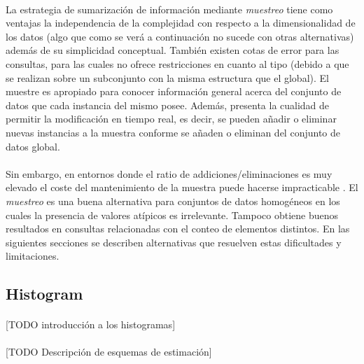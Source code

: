 \documentclass{subfiles}
\begin{document}
        \paragraph{}
        La estrategia de sumarización de información mediante \emph{muestreo} tiene como ventajas la independencia de la complejidad con respecto a la dimensionalidad de los datos (algo que como se verá a continuación no sucede con otras alternativas) además de su simplicidad conceptual. También existen cotas de error para las consultas, para las cuales no ofrece restricciones en cuanto al tipo (debido a que se realizan sobre un subconjunto con la misma estructura que el global). El muestre es apropiado para conocer información general acerca del conjunto de datos que cada instancia del mismo posee. Además, presenta la cualidad de permitir la modificación en tiempo real, es decir, se pueden añadir o eliminar nuevas instancias a la muestra conforme se añaden o eliminan del conjunto de datos global.

        \paragraph{}
        Sin embargo, en entornos donde el ratio de addiciones/eliminaciones es muy elevado el coste del mantenimiento de la muestra puede hacerse impracticable . El \emph{muestreo} es una buena alternativa para conjuntos de datos homogéneos en los cuales la presencia de valores atípicos es irrelevante. Tampoco obtiene buenos resultados en consultas relacionadas con el conteo de elementos distintos. En las siguientes secciones se describen alternativas que resuelven estas dificultades y limitaciones.

      \subsection{Histogram}
      \label{sec:histogram}

        \paragraph{}
        [TODO introducción a los histogramas]

        \paragraph{}
        [TODO Descripción de esquemas de estimación]
\end{document}
